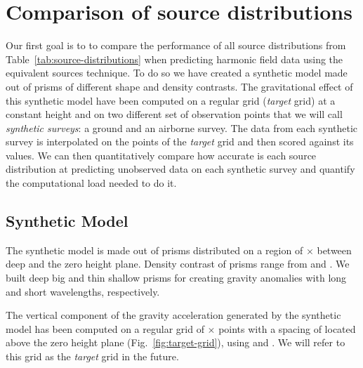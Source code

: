 \documentclass[twocolumn]{article}
\begin{document}
\section{Comparison of source distributions}

Our first goal is to to compare the performance of all source distributions
from Table~\ref{tab:source-distributions} when predicting harmonic field data
using the equivalent sources technique.
To do so we have created a synthetic model made out of prisms of different
shape and density contrasts.
The gravitational effect of this synthetic model have been computed on
a regular grid (\emph{target} grid) at a constant height and on two different
set of observation points that we will call \emph{synthetic surveys}: a ground
and an airborne survey.
The data from each synthetic survey is interpolated on the points of the
\emph{target} grid and then scored against its values.
We can then quantitatively compare how accurate is each source distribution at
predicting unobserved data on each synthetic survey and quantify the
computational load needed to do it.

\subsection{Synthetic Model}


The synthetic model is made out of \NPrisms{} prisms distributed on a region of
\ModelEasting{}$\times$\ModelNorthing{} between \ModelDepth{} deep and the zero
height plane.
Density contrast of prisms range from \ModelMinDensity{} and
\ModelMaxDensity{}.
We built deep big and thin shallow prisms for creating gravity anomalies with
long and short wavelengths, respectively.

The vertical component of the gravity acceleration generated by the synthetic
model has been computed on a regular grid of
\TargetEastingSize{}$\times$\TargetNorthingSize{} points with a spacing of
\TargetSpacing{} located \TargetHeight{} above the zero height plane
(Fig.~\ref{fig:target-grid}), using \citet{nagy2000} and \citet{nagy2002}.
We will refer to this grid as the \emph{target} grid in the future.
\end{document}
